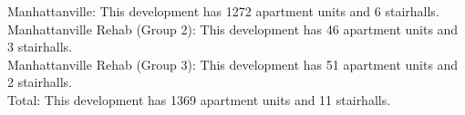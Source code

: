 {Manhattanville}: This development has 1272 apartment units and 6 stairhalls.\\{Manhattanville Rehab (Group 2)}: This development has 46 apartment units and 3 stairhalls.\\{Manhattanville Rehab (Group 3)}: This development has 51 apartment units and 2 stairhalls.\\{Total}: This development has 1369 apartment units and 11 stairhalls.\\